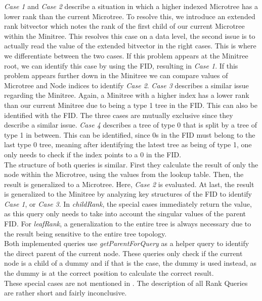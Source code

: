 \documentclass{article}
\begin{document}
\textit{Case 1} and \textit{Case 2} describe a situation in which a higher indexed Microtree has a lower rank than the current Microtree. To resolve this, we introduce an extended rank bitvector which notes the rank of the first child of our current Microtree within the Minitree. This resolves this case on a data level, the second issue is to actually read the value of the extended bitvector in the right cases. This is where we differentiate between the two cases. If this problem appears at the Minitree root, we can identify this case by using the FID, resulting in \textit{Case 1}. If this problem appears further down in the Minitree we can compare values of Microtree and Node indices to identify \textit{Case 2}. \textit{Case 3} describes a similar issue regarding the Minitree. Again, a Minitree with a higher index has a lower rank than our current Minitree due to being a type 1 tree in the FID. This can also be identified with the FID. The three cases are mutually exclusive since they describe a similar issue.
\textit{Case 4} describes a tree of type 0 that is split by a tree of type 1 in between. This can be identified, since 0s in the FID must belong to the last type 0 tree, meaning after identifying the latest tree as being of type 1, one only needs to check if the index points to a 0 in the FID.\\
The structure of both queries is similar. First they calculate the result of only the node within the Microtree, using the values from the lookup table. Then, the result is generalized to a Microtree. Here, \textit{Case 2} is evaluated. At last, the result is generalized to the Minitree by analyzing key structures of the FID to identify \textit{Case 1}, or \textit{Case 3}. In \textit{childRank}, the special cases immediately return the value, as this query only needs to take into account the singular values of the parent FID. For \textit{leafRank}, a generalization to the entire tree is always necessary due to the result being sensitive to the entire tree topology.\\
Both implemented queries use \textit{getParentForQuery} as a helper query to identify the direct parent of the current node. These queries only check if the current node is a child of a dummy and if that is the case, the dummy is used instead, as the dummy is at the correct position to calculate the correct result.\\
These special cases are not mentioned in \cite{farzanMunro}. The description of all Rank Queries are rather short and fairly inconclusive.\\ 
\end{document}
